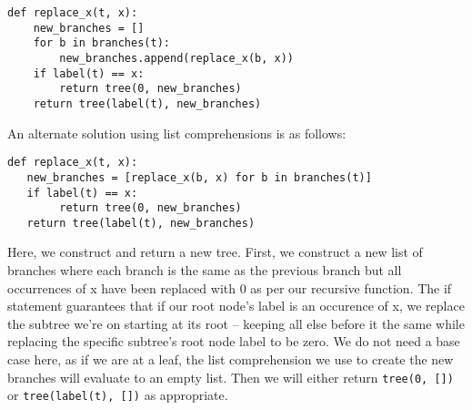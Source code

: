 \begin{blocksection}
\begin{solution}
\begin{lstlisting}
def replace_x(t, x):
    new_branches = []
    for b in branches(t):
        new_branches.append(replace_x(b, x))
    if label(t) == x:
        return tree(0, new_branches)
    return tree(label(t), new_branches)
\end{lstlisting}

An alternate solution using list comprehensions is as follows:

\begin{lstlisting}
def replace_x(t, x):
   new_branches = [replace_x(b, x) for b in branches(t)]
   if label(t) == x:
        return tree(0, new_branches)
   return tree(label(t), new_branches)
\end{lstlisting}

Here, we construct and return a new tree. First, we construct a new list of branches where each branch is the same
as the previous branch but all occurrences of x have been replaced with 0 as per our recursive function. 
The if statement guarantees that if our root node's label is an occurence of x, we replace the subtree we're on starting at its root --  
keeping all else before it the same while replacing the specific subtree's root node label to be zero.
\newline
We do not need a base case here, as if we are at a leaf, the list
comprehension we use to create the new branches will evaluate to an 
empty list. Then we will either return \lstinline$tree(0, [])$ or
\lstinline$tree(label(t), [])$ as appropriate. 
\end{solution}
\end{blocksection}


